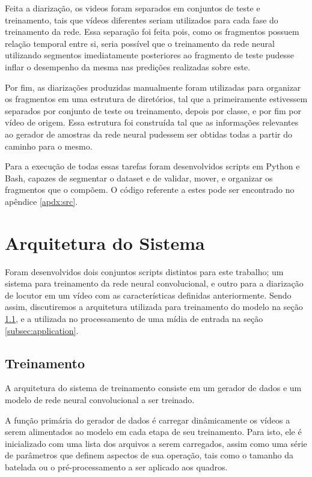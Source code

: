 Feita a diarização, os videos foram separados em conjuntos de teste e treinamento, tais que vídeos diferentes seriam utilizados para cada fase do treinamento da rede. Essa separação foi feita pois, como os fragmentos possuem relação temporal entre si, seria possível que o treinamento da rede neural utilizando segmentos imediatamente posteriores ao fragmento de teste pudesse inflar o desempenho da mesma nas predições realizadas sobre este.

Por fim, as diarizações produzidas manualmente foram utilizadas para organizar os fragmentos em uma estrutura de diretórios, tal que a primeiramente estivessem separados por conjunto de teste ou treinamento, depois por classe, e por fim por vídeo de origem. Essa estrutura foi construída tal que as informações relevantes ao gerador de amostras da rede neural pudessem ser obtidas todas a partir do caminho para o mesmo.

Para a execução de todas essas tarefas foram desenvolvidos scripts em Python e Bash, capazes de segmentar o dataset e de validar, mover, e organizar os fragmentos que o compõem. O código referente a estes pode ser encontrado no apêndice \ref{apdx:src}.

\section{Arquitetura do Sistema}
\label{sec:sysarch}

Foram desenvolvidos dois conjuntos scripts distintos para este trabalho; um sistema para treinamento da rede neural convolucional, e outro para a diarização de locutor em um vídeo com as características definidas anteriormente. Sendo assim, discutiremos a arquitetura utilizada para treinamento do modelo na seção \ref{subsec:train}, e a utilizada no processamento de uma mídia de entrada na seção \ref{subsec:application}.

\subsection{Treinamento}
\label{subsec:train}

A arquitetura do sistema de treinamento consiste em um gerador de dados e um modelo de rede neural convolucional a ser treinado.

% 

A função primária do gerador de dados é carregar dinâmicamente os vídeos a serem alimentados ao modelo em cada etapa de seu treinamento. Para isto, ele é inicializado com uma lista dos arquivos a serem carregados, assim como uma série de parâmetros que definem aspectos de sua operação, tais como o tamanho da batelada ou o pré-processamento a ser aplicado aos quadros.


